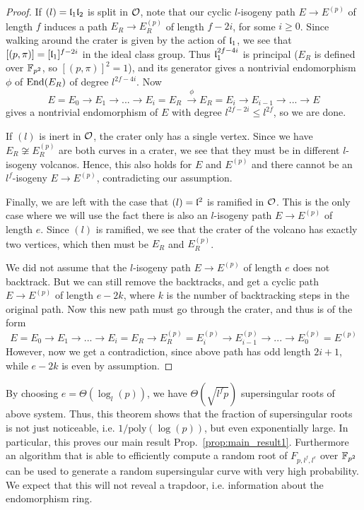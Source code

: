 \begin{proof}
    If $(l) = \mathfrak{l}_1 \mathfrak{l}_2$ is split in $\mathcal{O}$, note that our cyclic $l$-isogeny path $E \to E^{(p)}$ of length $f$ induces a path $E_R \to E_R^{(p)}$ of length $f - 2i$, for some $i \geq 0$.
    Since walking around the crater is given by the action of $\mathfrak{l}_1$, we see that $[(p, \pi)] = [\mathfrak{l}_1]^{f - 2i}$ in the ideal class group.
    Thus $\mathfrak{l}_1^{2f - 4i}$ is principal ($E_R$ is defined over $\mathbb{F}_{p^2}$, so $[(p, \pi)]^2 = 1$), and its generator gives a nontrivial endomorphism $\phi$ of $\mathrm{End}(E_R)$ of degree $l^{2f - 4i}$.
    Now
    \begin{equation*}
        E = E_0 \to E_1 \to ... \to E_i = E_R \ \overset{\phi}{\longrightarrow} E_R = E_i \to E_{i - 1} \to ... \to E
    \end{equation*}
    gives a nontrivial endomorphism of $E$ with degree $l^{2f - 2i} \leq l^{2f}$, so we are done.

    If $(l)$ is inert in $\mathcal{O}$, the crater only has a single vertex.
    Since we have $E_R \not\cong E_R^{(p)}$ are both curves in a crater, we see that they must be in different $l$-isogeny volcanos.
    Hence, this also holds for $E$ and $E^{(p)}$ and there cannot be an $l^f$-isogeny $E \to E^{(p)}$, contradicting our assumption.

    Finally, we are left with the case that $(l) = \mathfrak{l}^2$ is ramified in $\mathcal{O}$.
    This is the only case where we will use the fact there is also an $l$-isogeny path $E \to E^{(p)}$ of length $e$.
    Since $(l)$ is ramified, we see that the crater of the volcano has exactly two vertices, which then must be $E_R$ and $E_R^{(p)}$.

    We did not assume that the $l$-isogeny path $E \to E^{(p)}$ of length $e$ does not backtrack.
    But we can still remove the backtracks, and get a cyclic path $E \to E^{(p)}$ of length $e - 2k$, where $k$ is the number of backtracking steps in the original path.
    Now this new path must go through the crater, and thus is of the form
    \begin{equation*}
        E = E_0 \to E_1 \to ... \to E_i = E_R \to E_R^{(p)} = E_i^{(p)} \to E_{i - 1}^{(p)} \to ... \to E_0^{(p)} = E^{(p)}
    \end{equation*}
    However, now we get a contradiction, since above path has odd length $2i + 1$, while $e - 2k$ is even by assumption.
\end{proof}
By choosing $e = \Theta(\log_l(p))$, we have $\Theta(\sqrt{l^fp})$ supersingular roots of above system.
Thus, this theorem shows that the fraction of supersingular roots is not just noticeable, i.e. $1/\mathrm{poly}(\log(p))$, but even exponentially large.
In particular, this proves our main result Prop.~\ref{prop:main_result1}.
Furthermore an algorithm that is able to efficiently compute a random root of $F_{p, l^f, l^e}$ over $\mathbb{F}_{p^2}$ can be used to generate a random supersingular curve with very high probability.
We expect that this will not reveal a trapdoor, i.e. information about the endomorphism ring.

